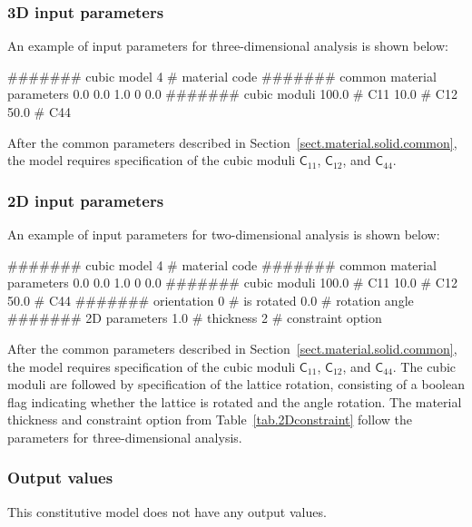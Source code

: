 \subsubsection{3D input parameters}
An example of input parameters for three-dimensional analysis is shown 
below:
\begin{inputfile}
####### cubic model
4     # material code
####### common material parameters
0.0    0.0    1.0
0      0.0
####### cubic moduli
100.0 # C11
 10.0 # C12
 50.0 # C44
\end{inputfile}
After the common parameters described in 
Section~\ref{sect.material.solid.common}, the 
model requires specification of the cubic moduli
$\mathsf{C}_{11}$, $\mathsf{C}_{12}$, and
$\mathsf{C}_{44}$.

\subsubsection{2D input parameters}
An example of input parameters for two-dimensional analysis is shown 
below:
\begin{inputfile}
####### cubic model
4     # material code
####### common material parameters
0.0    0.0    1.0
0      0.0
####### cubic moduli
100.0 # C11
 10.0 # C12
 50.0 # C44
####### orientation
0     # is rotated
0.0   # rotation angle 
####### 2D parameters
1.0   # thickness
2     # constraint option
\end{inputfile}
After the common parameters described in 
Section~\ref{sect.material.solid.common}, the 
model requires specification of the cubic moduli
$\mathsf{C}_{11}$, $\mathsf{C}_{12}$, and
$\mathsf{C}_{44}$.
The cubic moduli are followed by specification of the lattice 
rotation, consisting of a boolean flag indicating whether the lattice 
is rotated and the angle rotation.
The material thickness and 
constraint option from Table~\ref{tab.2Dconstraint} 
follow the parameters for three-dimensional analysis.

\subsubsection{Output values}
This constitutive model does not have any output values.

